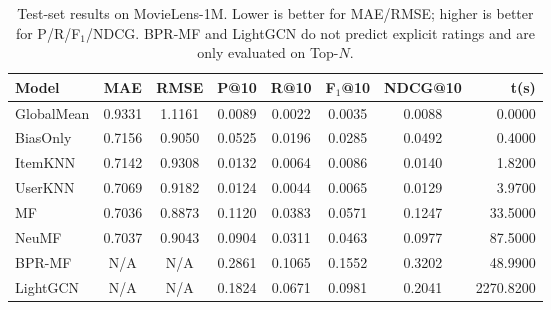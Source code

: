 \begin{table}[t]
\centering
\caption{Test-set results on MovieLens-1M. Lower is better for MAE/RMSE; higher is better for P/R/F$_1$/NDCG. BPR-MF and LightGCN do not predict explicit ratings and are only evaluated on Top-$N$.}
\label{tab:results}
\small
\begin{tabular}{lccccccr}
\toprule
Model & MAE & RMSE & P@10 & R@10 & F$_1$@10 & NDCG@10 & t(s) \\
\midrule
GlobalMean & 0.9331 & 1.1161 & 0.0089 & 0.0022 & 0.0035 & 0.0088 & 0.0000 \\
BiasOnly & 0.7156 & 0.9050 & 0.0525 & 0.0196 & 0.0285 & 0.0492 & 0.4000 \\
ItemKNN & 0.7142 & 0.9308 & 0.0132 & 0.0064 & 0.0086 & 0.0140 & 1.8200 \\
UserKNN & 0.7069 & 0.9182 & 0.0124 & 0.0044 & 0.0065 & 0.0129 & 3.9700 \\
MF & 0.7036 & 0.8873 & 0.1120 & 0.0383 & 0.0571 & 0.1247 & 33.5000 \\
NeuMF & 0.7037 & 0.9043 & 0.0904 & 0.0311 & 0.0463 & 0.0977 & 87.5000 \\
BPR-MF & N/A & N/A & 0.2861 & 0.1065 & 0.1552 & 0.3202 & 48.9900 \\
LightGCN & N/A & N/A & 0.1824 & 0.0671 & 0.0981 & 0.2041 & 2270.8200 \\
\bottomrule
\end{tabular}
\end{table}